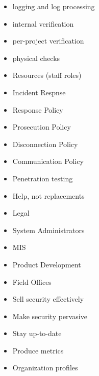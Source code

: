 \documentclass{slides}
\newcommand{\bi}{\begin{itemize}}
\newcommand{\ei}{\end{itemize}}
\begin{document}
\bi
\item logging and log processing
\item internal verification
\item per-project verification
\item physical checks
\ei


\bi
\item Resources (staff roles)
\item Incident Respnse
\item Response Policy
\item Prosecution Policy
\item Disconnection Policy
\item Communication Policy
\ei


\bi
\item Penetration testing
\item Help, not replacements
\ei


\bi
\item Legal
\item System Administrators
\item MIS
\item Product Development
\item Field Offices
\ei

\bi
\item Sell security effectively
\item Make security pervasive
\item Stay up-to-date
\item Produce metrics
\item Organization profiles
\ei
\end{document}
